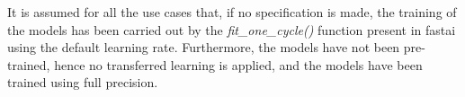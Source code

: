 It is assumed for all the use cases that, if no specification is made, the training of the models has been carried out by the \textit{fit\_one\_cycle()} function present in fastai using the default learning rate. Furthermore, the models have not been pre-trained, hence no transferred learning is applied, and the models have been trained using full precision. \\










